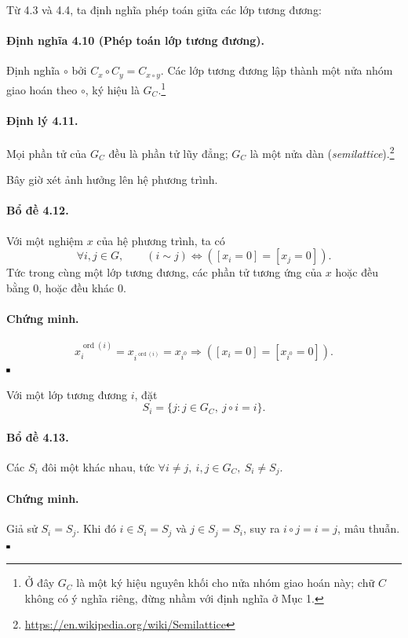 \documentclass[11pt]{article}
\newcommand{\qedmark}{\hfill\rule{0.7ex}{0.7ex}}
\begin{document}
Từ 4.3 và 4.4, ta định nghĩa phép toán giữa các lớp tương đương:

\paragraph{Định nghĩa 4.10 (Phép toán lớp tương đương).}
Định nghĩa \(\circ\) bởi \(C_x\circ C_y=C_{x\circ y}\). Các lớp tương đương lập
thành một nửa nhóm giao hoán theo \(\circ\), ký hiệu là \(G_C\).\footnote{Ở đây
\(G_C\) là một ký hiệu nguyên khối cho nửa nhóm giao hoán này; chữ \(C\) không
có ý nghĩa riêng, đừng nhầm với định nghĩa ở Mục 1.}

\paragraph{Định lý 4.11.}
Mọi phần tử của \(G_C\) đều là phần tử lũy đẳng; \(G_C\) là một nửa dàn
(\emph{semilattice}).\footnote{\url{https://en.wikipedia.org/wiki/Semilattice}}

Bây giờ xét ảnh hưởng lên hệ phương trình.

\paragraph{Bổ đề 4.12.}
Với một nghiệm \(x\) của hệ phương trình, ta có
\[
  \forall i,j\in G,\qquad
  (i\sim j)\Leftrightarrow ([x_i=0]=[x_j=0]).
\]
Tức trong cùng một lớp tương đương, các phần tử tương ứng của \(x\) hoặc đều
bằng \(0\), hoặc đều khác \(0\).

\paragraph{Chứng minh.}
\[
  x_i^{\operatorname{ord}(i)}=x_{i^{\operatorname{ord}(i)}}=x_{i^0}
  \Rightarrow ([x_i=0]=[x_{i^0}=0]).
\]
\(\qedmark\)

Với một lớp tương đương \(i\), đặt
\[
  S_i=\{j:j\in G_C,\ j\circ i=i\}.
\]

\paragraph{Bổ đề 4.13.}
Các \(S_i\) đôi một khác nhau, tức \(\forall i\ne j,\ i,j\in G_C,\ S_i\ne S_j\).

\paragraph{Chứng minh.}
Giả sử \(S_i=S_j\). Khi đó \(i\in S_i=S_j\) và \(j\in S_j=S_i\), suy ra
\(i\circ j=i=j\), mâu thuẫn. \(\qedmark\)
\end{document}
